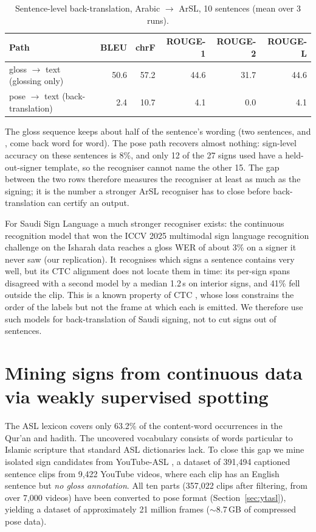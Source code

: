 \begin{table}[ht]
\centering\small
\caption{Sentence-level back-translation, Arabic $\rightarrow$ ArSL, 10 sentences (mean over 3 runs).}
\label{tab:bt_sentence}
\begin{tabular}{lrrrrr}
\toprule
Path & BLEU & chrF & ROUGE-1 & ROUGE-2 & ROUGE-L \\
\midrule
gloss $\rightarrow$ text (glossing only) & 50.6 & 57.2 & 44.6 & 31.7 & 44.6 \\
pose $\rightarrow$ text (back-translation) & 2.4 & 10.7 & 4.1 & 0.0 & 4.1 \\
\bottomrule
\end{tabular}
\end{table}

The gloss sequence keeps about half of the sentence's wording (two sentences,  and
, come back word for word). The pose path recovers almost nothing: sign-level accuracy on
these sentences is 8\%, and only 12 of the 27 signs used have a held-out-signer template, so the recogniser cannot name
the other 15. The gap between the two rows therefore measures the recogniser at least as much as the signing; it is the
number a stronger ArSL recogniser has to close before back-translation can certify an output.

For Saudi Sign Language a much stronger recogniser exists: the continuous recognition model that won the ICCV 2025
multimodal sign language recognition challenge on the Isharah data \cite{isharah,mslr2025} reaches a gloss WER of about
3\% on a signer it never saw (our replication). It recognises which signs a sentence contains very well, but its
CTC alignment does not locate them in time: its per-sign spans disagreed with a second model by a median 1.2\,s on
interior signs, and 41\% fell outside the clip. This is a known property of CTC \cite{ctc}, whose loss constrains the
order of the labels but not the frame at which each is emitted. We therefore use such models for back-translation of
Saudi signing, not to cut signs out of sentences.

\section{Mining signs from continuous data via weakly supervised spotting}
\label{sec:mining}
The ASL lexicon covers only 63.2\% of the content-word occurrences in the Qur'an and hadith. The uncovered vocabulary consists of words particular to Islamic scripture that standard ASL dictionaries lack. To close this gap we mine isolated sign candidates from YouTube-ASL \cite{youtubeasl,youtubeaslkp}, a dataset of 391,494 captioned sentence clips from 9,422 YouTube videos, where each clip has an English sentence but \emph{no gloss annotation}. All ten parts (357,022 clips after filtering, from over 7,000 videos) have been converted to pose format (Section~\ref{sec:ytasl}), yielding a dataset of approximately 21 million frames (\mbox{$\sim$8.7\,GB} of compressed pose data).

